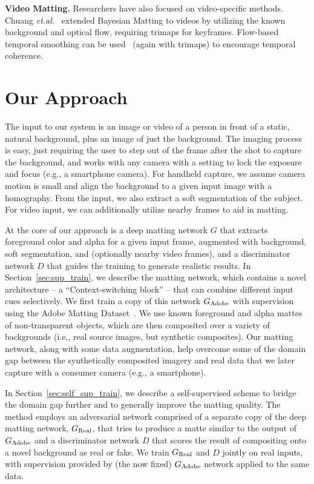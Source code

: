 \documentclass[10pt,twocolumn,letterpaper]{article}
\begin{document}
\textbf{Video Matting.} Researchers have also focused on video-specific methods. Chuang \textit{et.al.}~\cite{chuang2002video} extended Bayesian Matting to videos by utilizing the known background and optical flow, requiring trimaps for  keyframes. Flow-based temporal smoothing can be used~\cite{lee2010temporally,shahrian2014temporally} (again with trimaps) to encourage temporal coherence. 





%
 

\vspace{-0.5em}
\section{Our Approach}
\label{sec:model}
The input to our system is an image or video of a person in front of a static, natural background, plus an image of just the background.  The imaging process is easy, just requiring the user to step out of the frame after the shot to capture the background, and works with any camera with a setting to lock the exposure and focus (e.g., a smartphone camera).  For handheld capture, we assume camera motion is small and align the background to a given input image with a homography.  From the input, we also extract a soft segmentation of the subject.  For video input, we can additionally utilize nearby frames to aid in matting.

At the core of our approach is a deep matting network $G$ that extracts foreground color and alpha for a given input frame, augmented with background, soft segmentation, and (optionally nearby video frames), and a discriminator network $D$ that guides the training to generate realistic results.  In Section~\ref{sec:sup_train}, we describe the matting network, which contains a novel architecture -- a ``Context-switching block'' -- that can combine different input cues selectively.  We first train a copy of this network $G_{\rm Adobe}$ with supervision using the Adobe Matting Dataset~\cite{xu2017deep}. We use known foreground and alpha mattes of non-transparent objects, which are then composited over a variety of backgrounds (i.e., real source images, but synthetic composites).  Our matting network, along with some data augmentation, help overcome some of the domain gap between the synthetically composited imagery and real data that we later capture with a consumer camera (e.g., a smartphone).

In Section~\ref{sec:self_sup_train}, we describe a self-supervised scheme to bridge the domain gap further and to generally improve the matting quality.  The method employs an adversarial network comprised of a separate copy of the deep matting network, $G_{\rm Real}$, that tries to produce a matte similar to the output of $G_{\rm Adobe}$ and a discriminator network $D$ that scores the result of compositing onto a novel background as real or fake.  We train $G_{\rm Real}$ and $D$ jointly on real inputs, with supervision provided by (the now fixed) $G_{\rm Adobe}$ network applied to the same data.
\end{document}
